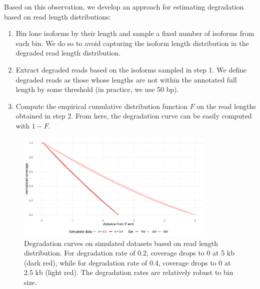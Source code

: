 Based on this observation, we develop an approach for estimating degradation based on read length distributions:
\begin{enumerate}
    \item Bin lone isoforms by their length and sample a fixed number of isoforms from each bin. We do so to avoid capturing the isoform length distribution in the degraded read length distribution.  
    \item Extract degraded reads based on the isoforms sampled in step 1. We define degraded reads as those whose lengths are not within the annotated full length by some threshold (in practice, we use 50 bp). 
    \item Compute the empirical cumulative distribution function $F$ on the read lengths obtained in step 2. From here, the degradation curve can be easily computed with $1-F$. 
\end{enumerate}

\begin{figure}[H]
    \centering
    \includegraphics[width=0.85\textwidth]{figures/sec-2-length-sim.png}
    \caption[Degradation curves on simulated datasets based on read length distribution]{Degradation curves on simulated datasets based on read length distribution. For degradation rate of 0.2, coverage drops to 0 at 5 kb (dark red), while for degradation rate of 0.4, coverage drops to 0 at 2.5 kb (light red). The degradation rates are relatively robust to bin size.}
    \label{fig:length-sim}
\end{figure}

